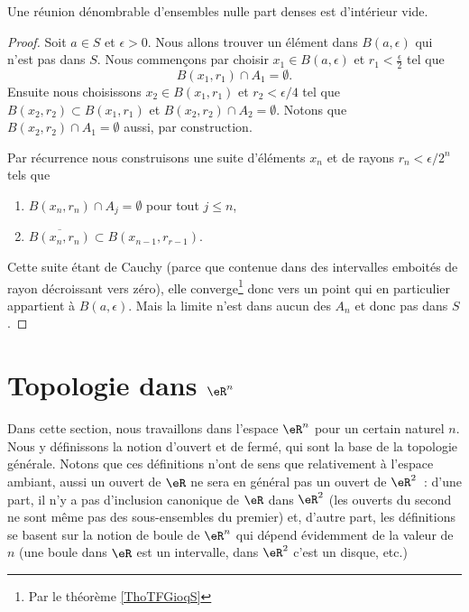 \begin{theorem}      \label{ThoQGalIO}
    Une réunion dénombrable d'ensembles nulle part denses est d'intérieur vide.
\end{theorem}

\begin{proof}
    Soit \( a\in S\) et \( \epsilon>0\). Nous allons trouver un élément dans \( B(a,\epsilon)\) qui n'est pas dans \( S\). Nous commençons par choisir \( x_1\in B(a,\epsilon)\) et \( r_1<\frac{ \epsilon }{2}\) tel que
    \begin{equation}
        B(x_1,r_1)\cap A_1=\emptyset.
    \end{equation}
    Ensuite nous choisissons \( x_2\in B(x_1,r_1)\) et \( r_2<\epsilon/4\) tel que \( B(x_2,r_2)\subset B(x_1,r_1)\) et \( B(x_2,r_2)\cap A_2=\emptyset\). Notons que \( B(x_2,r_2)\cap A_1=\emptyset\) aussi, par construction.

    Par récurrence nous construisons une suite d'éléments \( x_n\) et de rayons \( r_n<\epsilon/2^n\) tels que
    \begin{enumerate}
        \item
            \( B(x_n,r_n)\cap A_j=\emptyset\) pour tout \( j\leq n\),
        \item
            \( \overline{ B(x_n,r_n) }\subset B(x_{n-1},r_{r-1})\).
    \end{enumerate}
    Cette suite étant de Cauchy (parce que contenue dans des intervalles emboités de rayon décroissant vers zéro), elle converge\footnote{Par le théorème \ref{ThoTFGioqS}} donc vers un point qui en particulier appartient à \( B(a,\epsilon)\). Mais la limite n'est dans aucun des \( A_n\) et donc pas dans \( S\).
\end{proof}

%
   \section{Topologie dans \texorpdfstring{$\eR^n$}{Rn}}
%

Dans cette section, nous travaillons dans l'espace $\eR^n$ pour un certain naturel $n$. Nous y définissons la notion d'ouvert et de fermé, qui sont la base de la topologie générale. Notons que ces définitions n'ont de sens que relativement à l'espace ambiant, aussi un ouvert de $\eR$ ne sera en général pas un ouvert de $\eR^2$~: d'une part, il n'y a pas d'inclusion canonique de $\eR$ dans $\eR^2$ (les ouverts du second ne sont même pas des sous-ensembles du premier) et, d'autre part, les définitions se basent sur la notion de boule de $\eR^n$ qui dépend évidemment de la valeur de $n$ (une boule dans $\eR$ est un intervalle, dans $\eR^2$ c'est un disque, etc.)

